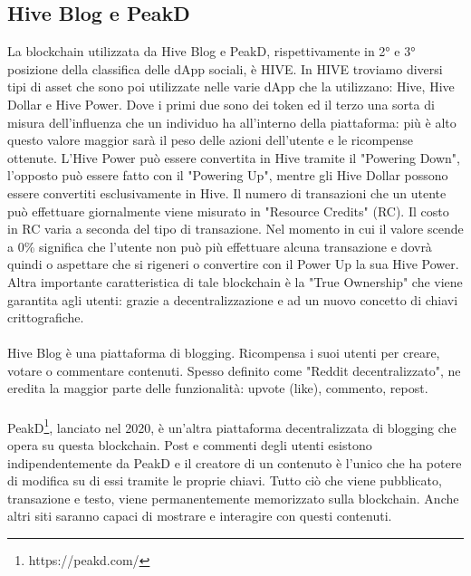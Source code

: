 \subsection{Hive Blog e PeakD}
La blockchain utilizzata da Hive Blog e PeakD, rispettivamente in 2° e 3° posizione della classifica delle dApp sociali, è HIVE. In HIVE troviamo diversi tipi di asset che sono poi utilizzate nelle varie dApp che la utilizzano: Hive, Hive Dollar e Hive Power.
Dove i primi due sono dei token ed il terzo una sorta di misura dell'influenza che un individuo ha all'interno della piattaforma: più è alto questo valore maggior sarà il peso delle azioni dell'utente e le ricompense ottenute. L'Hive Power può essere convertita in Hive tramite il "Powering Down", l'opposto può essere fatto con il "Powering Up", mentre gli Hive Dollar possono essere convertiti esclusivamente in Hive.
Il numero di transazioni che un utente può effettuare giornalmente viene misurato in "Resource Credits" (RC). Il costo in RC varia a seconda del tipo di transazione. Nel momento in cui il valore scende a 0\% significa che l'utente non può più effettuare alcuna transazione e dovrà quindi o aspettare che si rigeneri o convertire con il Power Up la sua Hive Power.
\\
Altra importante caratteristica di tale blockchain è la "True Ownership" che viene garantita agli utenti: grazie a decentralizzazione e ad un nuovo concetto di chiavi crittografiche.
\\
\\
Hive Blog\cite{marwan2020HiveBlog} è una piattaforma di blogging. Ricompensa i suoi utenti per creare, votare o commentare contenuti. Spesso definito come "Reddit decentralizzato", ne eredita la maggior parte delle funzionalità: upvote (like), commento, repost.
\\
\\
PeakD\footnote{https://peakd.com/}, lanciato nel 2020, è un'altra piattaforma decentralizzata di blogging che opera su questa blockchain. Post e commenti degli utenti esistono indipendentemente da PeakD e il creatore di un contenuto è l'unico che ha potere di modifica su di essi tramite le proprie chiavi. 
Tutto ciò che viene pubblicato, transazione e testo, viene permanentemente memorizzato sulla blockchain. Anche altri siti saranno capaci di mostrare e interagire con questi contenuti.

